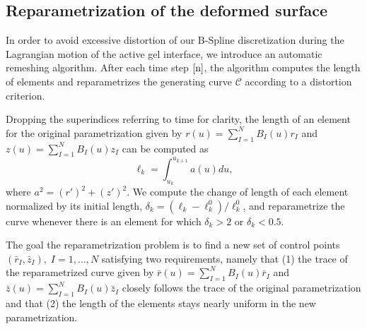 {\subsection{Reparametrization of the deformed surface}

In order to avoid excessive distortion of our B-Spline discretization during the Lagrangian motion of the active gel interface, we introduce an automatic remeshing algorithm. After each time step $\left[ \textup{n}\right]$, the algorithm computes the length of elements and reparametrizes the generating curve $\mathcal{C}$ according to a distortion criterion. 

Dropping the superindices referring to time for clarity, the length of an element 
for the original parametrization given by ${r}(u)=\sum_{I=1}^N B_I(u) {r}_I$ and ${z}(u)=\sum_{I=1}^N B_I(u) {z}_I$ can be computed as
\begin{equation}
\ell_k = \int_{u_k}^{u_{k+1}} a(u) du,
\end{equation}
where $a^2 = (r')^2 + (z')^2$. We compute the change of length of each element normalized by its initial length,  $\delta_k  = (\ell_k- \ell^0_k)/ \ell^0_k$, and  reparametrize the curve whenever there is an element for which $\delta_k>2$ or $\delta_k<0.5$.

The goal the reparametrization problem is to find a new set of control points $(\bar{r}_I, \bar{z}_I), \; I = 1, \ldots, N$ satisfying two requirements, namely that (1) the trace of the reparametrized curve given by $\bar{r}(u)=\sum_{I=1}^N B_I(u) \bar{r}_I$ and $\bar{z}(u)=\sum_{I=1}^N B_I(u) \bar{z}_I$ closely follows the trace of the original parametrization and that (2) the length of the elements stays nearly uniform in the new parametrization. 

}
